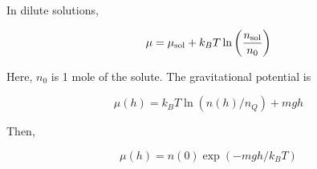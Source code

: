 \documentclass{article}
\newtheorem{one minute paper}[theorem]{One Minute Paper}
\begin{document}
In dilute solutions, 

\begin{equation}
    \mu = \mu_{\rm sol} + k_B T \ln\left( \frac{n_{\rm sol}}{n_0} \right)
\end{equation}

Here, $n_0$ is 1 mole of the solute. The gravitational potential is 

\begin{equation}
    \mu(h) = k_B T \ln\left( n(h)/n_Q \right) + mgh        
\end{equation}

Then, 

\begin{equation}
    \mu(h) = n(0)\exp(-mgh/k_B T)
\end{equation}
\end{document}
